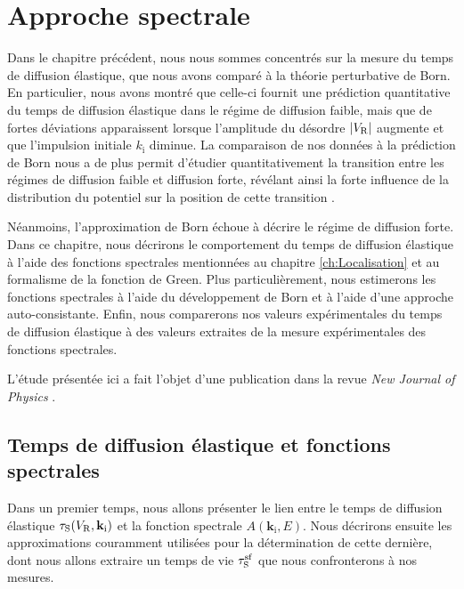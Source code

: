 

\chapter{Approche spectrale}
\label{ch:TauS_NJP}

Dans le chapitre précédent, nous nous sommes concentrés sur la mesure du temps de diffusion élastique, que nous avons comparé à la théorie perturbative de Born. En particulier, nous avons montré que celle-ci fournit une prédiction quantitative du temps de diffusion élastique dans le régime de diffusion faible, mais que de fortes déviations apparaissent lorsque l'amplitude du désordre $|V_{\mathrm{R}}|$ augmente et que l'impulsion initiale $k_{\mathrm{i}}$ diminue. La comparaison de nos données à la prédiction de Born nous a de plus permit d'étudier quantitativement la transition entre les régimes de diffusion faible et diffusion forte, révélant ainsi la forte influence de la distribution du potentiel sur la position de cette transition \citep{richard2019elastic}. 

Néanmoins, l'approximation de Born échoue à décrire le régime de diffusion forte. Dans ce chapitre, nous décrirons le comportement du temps de diffusion élastique à l'aide des fonctions spectrales mentionnées au chapitre \ref{ch:Localisation} et au formalisme de la fonction de Green. Plus particulièrement, nous estimerons les fonctions spectrales à l'aide du développement de Born et à l'aide d'une approche auto-consistante. Enfin, nous comparerons nos valeurs expérimentales du temps de diffusion élastique à des valeurs extraites de la mesure expérimentales des fonctions spectrales.

L'étude présentée ici a fait l'objet d'une publication dans la revue \emph{New Journal of Physics} \citep{signoles2019ultracold}.

\section{Temps de diffusion élastique et fonctions spectrales}

Dans un premier temps, nous allons présenter le lien entre le temps de diffusion élastique $\tau_{\mathrm{S}}(V_{\mathrm{R}},\mathbf{k}_{\mathrm{i}})$ et la fonction spectrale $A(\mathbf{k}_{\mathrm{i}},E)$. Nous décrirons ensuite les approximations couramment utilisées pour la détermination de cette dernière, dont nous allons extraire un temps de vie $\tau_{\mathrm{S}}^{\mathrm{sf}}$ que nous confronterons à nos mesures. 



